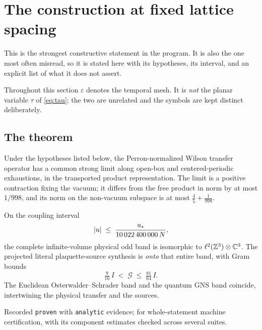\section{The construction at fixed lattice spacing}
\label{sec:wilson}

This is the strongest constructive statement in the program. It is also
the one most often misread, so it is stated here with its hypotheses,
its interval, and an explicit list of what it does not assert.

Throughout this section $\varepsilon$ denotes the temporal mesh. It is
\emph{not} the planar variable $\tau$ of \eqref{eq:tau}; the two are
unrelated and the symbols are kept distinct deliberately.

\subsection{The theorem}

\begin{theorem}
\label{thm:wilsonband}
Under the hypotheses listed below, the Perron-normalized Wilson transfer
operator has a common strong limit along open-box and centered-periodic
exhaustions, in the transported product representation. The limit is a
positive contraction fixing the vacuum; it differs from the free product
in norm by at most $1/998$, and its norm on the non-vacuum subspace is
at most $\tfrac45 + \tfrac1{998}$.

On the coupling interval
\begin{equation}
  \left\lvert u \right\rvert \;\le\; \frac{u_*}{10\,022\,400\,000\,N},
  \label{eq:wilson-interval}
\end{equation}
the complete infinite-volume physical odd band is isomorphic to
$\ell^2(\mathbb{Z}^3) \otimes \mathbb{C}^3$. The projected literal plaquette-source
synthesis is \emph{onto} that entire band, with Gram bounds
\begin{equation}
  \tfrac{9}{16}\,I \;<\; \mathcal{G} \;\le\; \tfrac{81}{64}\,I .
\end{equation}
The Euclidean Osterwalder--Schrader band and the quantum GNS band
coincide, intertwining the physical transfer and the sources.
\end{theorem}

\noindent Recorded \texttt{proven} with \texttt{analytic} evidence;
\Tthree{} for whole-statement machine certification, with its component
estimates checked across several suites.

